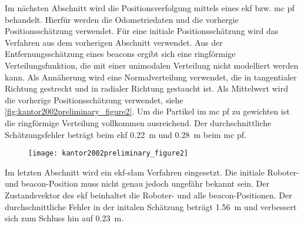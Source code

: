 Im nächsten Abschnitt wird die Positionsverfolgung mittels eines \Gls{ekf} bzw. \Gls{mc} \Gls{pf} behandelt. Hierfür werden die Odometriedaten und die vorhergie Positionsschätzung verwendet. Für eine initiale Positionsschätzung wird das Verfahren aus dem vorherigen Abschnitt verwendet. Aus der Entfernungsschätzung eines \Glspl{beacon} ergibt sich eine ringförmige Verteilungsfunktion, die mit einer unimodalen Verteilung nicht modelliert werden kann. Als Annäherung wird eine Normalverteilung verwendet, die in tangentialer Richtung gestreckt und in radialer Richtung gestaucht ist. Als Mittelwert wird die vorherige Positionsschätzung verwendet, siehe \autoref{fig:kantor2002preliminary_figure2}. Um die Partikel im \Gls{mc} \Gls{pf} zu gewichten ist die ringförmige Verteilung vollkommen ausreichend. Der durchschnittliche Schätzungsfehler beträgt beim \Gls{ekf} \SI{0.22}{\metre} und \SI{0.28}{\metre} beim \Gls{mc} \Gls{pf}.

\begin{figure}
	\centering
	\texttt{[image: kantor2002preliminary\_figure2]}
	\label{fig:kantor2002preliminary_figure2}
\end{figure}

Im letzten Abschnitt wird ein \gls{ekf}-\Gls{slam} Verfahren eingesetzt. Die initiale Roboter- und \Gls{beacon}-Position muss nicht genau jedoch ungefähr bekannt sein. Der Zustandsvektor des \Gls{ekf} beinhaltet die Roboter- und alle \Gls{beacon}-Positionen. Der durchschnittliche Fehler in der initalen Schätzung beträgt \SI{1.56}{\metre} und verbessert sich zum Schluss hin auf \SI{0.23}{\metre}.


%
%


%
%

